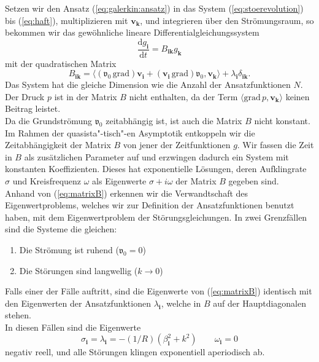 \documentclass[10pt,a5paper,oneside,draft]{book}
\numberwithin{equation}{chapter}
\begin{document}
Setzen wir den Ansatz (\mbox{\ref{eq:galerkin:ansatz}}) in das System (\mbox{\ref{eq:stoerevolution}}) bis (\mbox{\ref{eq:haft}}), multiplizieren mit $\mathbf{v_k}$, und integrieren \"uber den Str\"omungsraum, so bekommen wir das gew\"ohnliche lineare Differentialgleichungssystem
\begin{equation}\label{eq:galerkin:system}
	\frac{\mathrm{d} g_\mathbf{i}}{\mathrm{d} t} = B_{\mathbf{ik}} g_\mathbf{k} 
\end{equation}
mit der quadratischen Matrix
\begin{equation}\label{eq:matrixB}
	B_{\mathbf{ik}} = \langle (\mathfrak{v}_0 \,\mathrm{grad}) \mathbf{v_i} + (\mathbf{v_i} \,\mathrm{grad}) \mathfrak{v}_0 , \mathbf{v_k}\rangle + \lambda_\mathbf{i} \delta_{\mathbf{ik}}.
\end{equation}
Das System hat die gleiche Dimension wie die Anzahl der Ansatzfunktionen $N$.
Der Druck $p$ ist in der Matrix $B$ nicht enthalten, da der Term $\langle\mathrm{grad}\,p,\mathbf{v_k}\rangle$ keinen Beitrag leistet.\\
Da die Grundstr\"omung $\mathfrak{v}_0$ zeitabh\"angig ist, ist auch die Matrix $B$ nicht konstant.
Im Rahmen der quasista"-tisch"-en Asymptotik entkoppeln wir die Zeitabh\"angigkeit der Matrix $B$ von jener der Zeitfunktionen $g$.
Wir fassen die Zeit in $B$ als zus\"atzlichen Parameter auf und erzwingen dadurch ein System mit konstanten Koeffizienten.
Dieses hat exponentielle L\"osungen, deren Aufklingrate $\sigma$ und Kreisfrequenz $\omega$ als Eigenwerte $\sigma + i\omega$ der Matrix $B$ gegeben sind.\\

Anhand von (\mbox{\ref{eq:matrixB}}) erkennen wir die Verwandtschaft des Eigenwertproblems, welches wir zur Definition der Ansatzfunktionen benutzt haben, mit dem Eigenwertproblem der St\"orungsgleichungen.
In zwei Grenzf\"allen sind die Systeme die gleichen:
\begin{enumerate}
	\item Die Str\"omung ist ruhend ($\mathfrak{v}_0 = 0$)
	\item Die St\"orungen sind langwellig ($k\to 0$)
\end{enumerate}
Falls einer der F\"alle auftritt, sind die Eigenwerte von (\mbox{\ref{eq:matrixB}}) identisch mit den Eigenwerten der Ansatzfunktionen $\lambda_\mathbf{i}$, welche in $B$ auf der Hauptdiagonalen stehen.\\
In diesen F\"allen sind die Eigenwerte
\begin{equation}
	\sigma_\mathbf{i} = \lambda_{\mathbf{i}} = -(1/R)(\beta_\mathbf{i}^2+k^2) \qquad \omega_\mathbf{i} = 0
\end{equation}
negativ reell, und alle St\"orungen klingen exponentiell aperiodisch ab.\\
\end{document}
